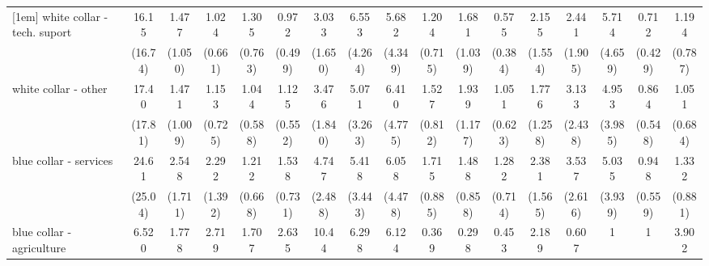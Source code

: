{\begin{tabular}{l*{16}{c}}
[1em]
white collar - tech. suport&       16.15\sym{**} &       1.477         &       1.024         &       1.305         &       0.972         &       3.033\sym{*}  &       6.553\sym{**} &       5.682\sym{*}  &       1.204         &       1.681         &       0.575         &       2.155         &       2.441         &       5.714\sym{*}  &       0.712         &       1.194         \\
                    &     (16.74)         &     (1.050)         &     (0.661)         &     (0.763)         &     (0.499)         &     (1.650)         &     (4.264)         &     (4.349)         &     (0.715)         &     (1.039)         &     (0.384)         &     (1.554)         &     (1.905)         &     (4.659)         &     (0.429)         &     (0.787)         \\
[1em]
white collar - other&       17.40\sym{**} &       1.471         &       1.153         &       1.044         &       1.125         &       3.476\sym{*}  &       5.071\sym{*}  &       6.410\sym{*}  &       1.527         &       1.939         &       1.051         &       1.776         &       3.133         &       4.953\sym{*}  &       0.864         &       1.051         \\
                    &     (17.81)         &     (1.009)         &     (0.725)         &     (0.588)         &     (0.552)         &     (1.840)         &     (3.263)         &     (4.775)         &     (0.812)         &     (1.177)         &     (0.623)         &     (1.258)         &     (2.438)         &     (3.985)         &     (0.548)         &     (0.684)         \\
[1em]
blue collar - services&       24.61\sym{**} &       2.548         &       2.292         &       1.212         &       1.538         &       4.747\sym{**} &       5.418\sym{**} &       6.058\sym{*}  &       1.715         &       1.488         &       1.282         &       2.381         &       3.537         &       5.035\sym{*}  &       0.948         &       1.332         \\
                    &     (25.04)         &     (1.711)         &     (1.392)         &     (0.668)         &     (0.731)         &     (2.488)         &     (3.443)         &     (4.478)         &     (0.885)         &     (0.858)         &     (0.714)         &     (1.565)         &     (2.616)         &     (3.939)         &     (0.559)         &     (0.881)         \\
[1em]
blue collar - agriculture&       6.520         &       1.778         &       2.719         &       1.707         &       2.635         &       10.44\sym{***}&       6.298\sym{*}  &       6.124         &       0.369         &       0.298         &       0.453         &       2.189         &       0.607         &           1         &           1         &       3.902         \\

\end{tabular}}
